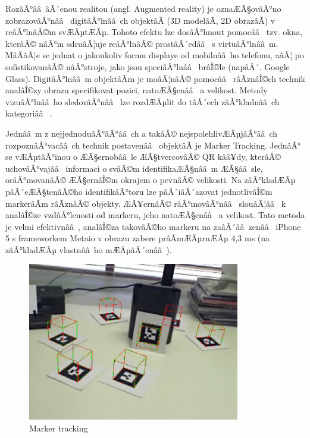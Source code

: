 \documentclass[twoside,12pt]{article}
\begin{document}
%
%

RozâÂ°ââ âÃ´enou realitou (angl. Augmented reality) je oznaÆÃ§ovâÂ°no zobrazovâÂ°nââ  digitâÂ°lnââ ch objektâÃ (3D modelâÃ, 2D obrazâÃ) v reâÂ°lnâÂ©m svÆÃµtÆÃµ. Tohoto efektu lze dosâÂ°hnout pomocââ  tzv. okna, kterâÂ© nâÂ°m sdruâÃ¦uje reâÂ°lnâÂ© prostâÃ´edââ  s virtuâÂ°lnââ m. MâÃâÃ¦e se jednat o jakoukoliv formu displaye od mobilnââ ho telefonu, aâÃ¦ po sofistikovanâÂ© nâÂ°stroje, jako jsou speciâÂ°lnââ  brâÎ©le (napâÃ´. Google Glass). DigitâÂ°lnââ m objektâÃm je moâÃ¦nâÂ© pomocââ  râÃznâÎ©ch technik analâÎ©zy obrazu specifikovat pozici, natoÆÃ§enââ  a velikost. Metody vizuâÂ°lnââ ho sledovâÂ°nââ  lze rozdÆÃµlit do tâÃ´ech zâÂ°kladnââ ch kategoriââ  \cite{klein_visual_tracking}.

Jednââ m z nejjednoduâÂ°âÂ°ââ ch a takâÂ© nejspolehlivÆÃµjâÂ°ââ ch rozpoznâÂ°vacââ ch technik postavenââ  objektâÃ je Marker Tracking. JednâÂ° se vÆÃµtâÂ°inou o ÆÃ§ernobââ le ÆÃ§tvercovâÂ© QR kââ¥dy, kterâÂ© uchovâÂ°vajââ  informaci o svâÂ©m identifikaÆÃ§nââ m ÆÃ§ââ sle, orâÂ°movanâÂ© ÆÃ§ernâÎ©m okrajem o pevnâÂ© velikosti. Na zâÂ°kladÆÃµ pâÃ´eÆÃ§tenâÂ©ho identifikâÂ°toru lze pâÃ´iâÃ´azovat jednotlivâÎ©m markerâÃm râÃznâÂ© objekty. ÆÃ¥ernâÂ© râÂ°movâÂ°nââ  slouâÃ¦ââ  k analâÎ©ze vzdâÂ°lenosti od markeru, jeho natoÆÃ§enââ  a velikost. Tato metoda je velmi efektivnââ , analâÎ©za takovâÂ©ho markeru na zaâÃ´ââ zenââ  iPhone 5 s frameworkem Metaio v obrazu zabere prâÃmÆÃµrnÆÃµ 4,3 ms (na zâÂ°kladÆÃµ vlastnââ ho mÆÃµâÃ´enââ ).

\begin{figure}[H]
    \includegraphics[width=350px, center]{images/marker-tracking.jpg}
    \caption{Marker tracking}
    \label{marker_tracking}
\end{figure}
\end{document}
